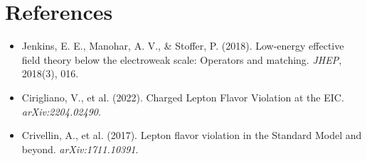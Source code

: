 \documentclass[11pt,a4paper]{article}
\begin{document}
\section*{References}

\begin{itemize}
\item Jenkins, E. E., Manohar, A. V., \& Stoffer, P. (2018). Low-energy effective field theory below the electroweak scale: Operators and matching. \textit{JHEP}, 2018(3), 016.
\item Cirigliano, V., et al. (2022). Charged Lepton Flavor Violation at the EIC. \textit{arXiv:2204.02490}.
\item Crivellin, A., et al. (2017). Lepton flavor violation in the Standard Model and beyond. \textit{arXiv:1711.10391}.
\end{itemize}
\end{document}
